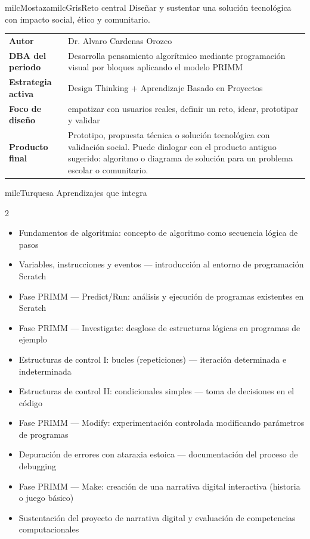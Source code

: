 \documentclass[11pt,letterpaper]{article}
\begin{document}
\begin{softbox}{milcMostaza}{milcGris}{Reto central}
Diseñar y sustentar una solución tecnológica con impacto social, ético y comunitario.
\end{softbox}

\begin{tabularx}{\textwidth}{>{\bfseries}p{3.4cm}X}
\rowcolor{milcMagenta!12}Autor & Dr. Alvaro Cardenas Orozco\\
DBA del periodo & Desarrolla pensamiento algorítmico mediante programación visual por bloques aplicando el modelo PRIMM\\
Estrategia activa & Design Thinking + Aprendizaje Basado en Proyectos\\
Foco de diseño & empatizar con usuarios reales, definir un reto, idear, prototipar y validar\\
Producto final & Prototipo, propuesta técnica o solución tecnológica con validación social. Puede dialogar con el producto antiguo sugerido: algoritmo o diagrama de solución para un problema escolar o comunitario.\\
\end{tabularx}

\begin{titlebox}{milcTurquesa}
Aprendizajes que integra
\end{titlebox}
\begin{multicols}{2}
\begin{itemize}[leftmargin=*]
\item Fundamentos de algoritmia: concepto de algoritmo como secuencia lógica de pasos
\item Variables, instrucciones y eventos — introducción al entorno de programación Scratch
\item Fase PRIMM — Predict/Run: análisis y ejecución de programas existentes en Scratch
\item Fase PRIMM — Investigate: desglose de estructuras lógicas en programas de ejemplo
\item Estructuras de control I: bucles (repeticiones) — iteración determinada e indeterminada
\item Estructuras de control II: condicionales simples — toma de decisiones en el código
\item Fase PRIMM — Modify: experimentación controlada modificando parámetros de programas
\item Depuración de errores con ataraxia estoica — documentación del proceso de debugging
\item Fase PRIMM — Make: creación de una narrativa digital interactiva (historia o juego básico)
\item Sustentación del proyecto de narrativa digital y evaluación de competencias computacionales
\end{itemize}
\end{multicols}
\end{document}
